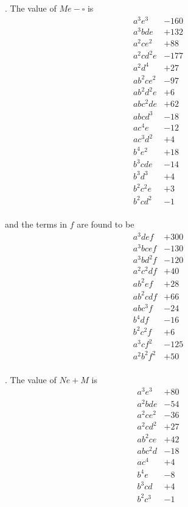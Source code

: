 \documentclass[11pt]{article}
\begin{document}
. The value of $M e - \square$ is
\[
\begin{array}{rr}
a^3 e^3       & -160\\
a^3 b d e     & +132\\
a^2 c e^2     & +88\\
a^2 c d^2 e   & -177\\
a^2 d^4       & +27\\
a b^2 c e^2   & -97\\
a b^2 d^2 e   & +6\\
a b c^2 d e   & +62\\
a b c d^3     & -18\\
a c^4 e       & -12\\
a c^3 d^2     & +4\\
b^4 e^2       & +18\\
b^3 c d e     & -14\\
b^3 d^3       & +4\\
b^2 c^2 e     & +3\\
b^2 c d^2     & -1\\
\end{array}
\]

\noindent and the terms in $f$ are found to be
\[
\begin{array}{rr}
a^3 d e f      & +300\\
a^3 b c e f    & -130\\
a^3 b d^2 f    & -120\\
a^2 c^2 d f    & +40\\
a b^2 e f      & +28\\
a b^2 c d f    & +66\\
a b c^3 f      & -24\\
b^4 d f        & -16\\
b^2 c^2 f      & +6\\
a^3 c f^2      & -125\\
a^2 b^2 f^2    & +50\\
\end{array}
\]

\medskip

. The value of $N e + M$ is
\[
\begin{array}{rr}
a^3 e^3       & +80\\
a^2 b d e     & -54\\
a^2 c e^2     & -36\\
a^2 c d^2     & +27\\
a b^2 c e     & +42\\
a b c^2 d     & -18\\
a c^4         & +4\\
b^4 e         & -8\\
b^3 c d       & +4\\
b^2 c^3       & -1\\
\end{array}
\]
\end{document}
